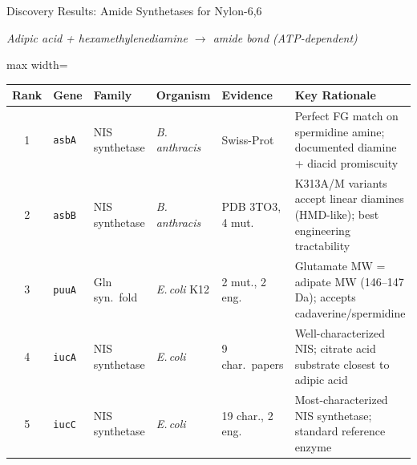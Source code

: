 \documentclass[aspectratio=169, 11pt]{beamer}
\begin{document}
\begin{frame}{Discovery Results: Amide Synthetases for Nylon-6,6}
\vspace{-10pt}
\begin{center}
\scriptsize\color{darkgray} \textit{Adipic acid + hexamethylenediamine $\rightarrow$ amide bond (ATP-dependent)}
\end{center}
\vspace{-2pt}

{\scriptsize
\begin{adjustbox}{max width=\textwidth}
\begin{tabular}{@{}c l l l l p{5.5cm}@{}}
\toprule
\textbf{Rank} & \textbf{Gene} & \textbf{Family} & \textbf{Organism} & \textbf{Evidence} & \textbf{Key Rationale}\\
\midrule
1 & \texttt{asbA} & NIS synthetase & \textit{B.\,anthracis} & Swiss-Prot &
Perfect FG match on spermidine amine; documented diamine + diacid promiscuity\\
2 & \texttt{asbB} & NIS synthetase & \textit{B.\,anthracis} & PDB 3TO3, 4 mut. &
K313A/M variants accept linear diamines (HMD-like); best engineering tractability\\
3 & \texttt{puuA} & Gln syn.\ fold & \textit{E.\,coli} K12 & 2 mut., 2 eng. &
Glutamate MW = adipate MW (146--147 Da); accepts cadaverine/spermidine\\
4 & \texttt{iucA} & NIS synthetase & \textit{E.\,coli} & 9 char.\ papers &
Well-characterized NIS; citrate acid substrate closest to adipic acid\\
5 & \texttt{iucC} & NIS synthetase & \textit{E.\,coli} & 19 char., 2 eng. &
Most-characterized NIS synthetase; standard reference enzyme\\
\bottomrule
\end{tabular}
\end{adjustbox}
}


\end{frame}
\end{document}
